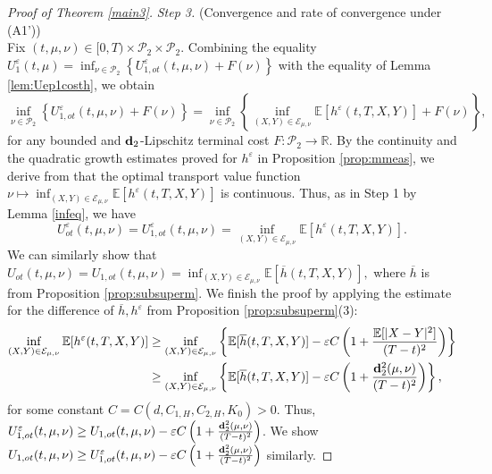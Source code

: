 \documentclass[reqno,11pt]{amsart}
\numberwithin{equation}{section}
\newcommand{\R}{\mathbb{R}} %
\newcommand{\e}{\varepsilon}
\newcommand{\nd}{\noindent}
\begin{document}
\begin{proof}[Proof of Theorem \ref{main3}]
\nd
    \textit{Step 3.} (Convergence and rate of convergence under (A1'))\\
    Fix $(t,\mu,\nu)\in [0,T)\times\mathcal{P}_2\times\mathcal{P}_2$. Combining the equality $U^\e_1(t,\mu)=\inf_{\nu\in \mathcal{P}_2}\left\{ U^\e_{1,ot}(t,\mu,\nu)+F(\nu) \right\}$ with the equality of Lemma \ref{lem:Uep1costh}, we obtain
    $$\inf_{\nu\in \mathcal{P}_2}\left\{ U^\e_{1,ot}(t,\mu,\nu)+F(\nu) \right\}=\inf_{\nu\in \mathcal{P}_2}\left\{ \inf_{(X, Y) \in \mathcal{E}_{\mu,\nu}}
\mathbb{E}[h^\e(t,T,X,Y)]+F(\nu) \right\},$$
    for any bounded and ${\bf d}_2$-Lipschitz terminal cost $F:\mathcal{P}_2\to \R$. By the continuity and the quadratic growth estimates proved for $h^\e$ in Proposition \ref{prop:mmeas}, we derive from \cite[Theorem 5.20]{villani2009optimal} that the optimal transport value function $\nu\mapsto \inf_{(X, Y) \in \mathcal{E}_{\mu,\nu}}
\mathbb{E}[h^\e(t,T,X,Y)]$ is continuous. Thus, as in Step 1 by Lemma \ref{infeq}, we have
$$U^\e_{ot}(t,\mu,\nu)=U^\e_{1,ot}(t,\mu,\nu)=\inf_{(X, Y) \in \mathcal{E}_{\mu,\nu}}\mathbb{E}[h^\e(t,T,X,Y)].$$
We can similarly show that
$U_{ot}(t,\mu,\nu)=U_{1,ot}(t,\mu,\nu)=\inf_{(X, Y) \in \mathcal{E}_{\mu,\nu}}\mathbb{E}[\overline{h}(t,T,X,Y)],$
where $\overline{h}$ is from Proposition \ref{prop:subsuperm}. We finish the proof by applying the estimate for the difference of $\overline{h},h^\e$ from Proposition \ref{prop:subsuperm}(3):
\begin{align*}
    \inf_{(X, Y) \in \mathcal{E}_{\mu,\nu}}\mathbb{E}[h^\e(t,T,X,Y)]&\ge \inf_{(X, Y) \in \mathcal{E}_{\mu,\nu}}\left\{\mathbb{E}[\overline{h}(t,T,X,Y)]-\e C\left(1+\frac{\mathbb{E}[|X-Y|^2]}{(T-t)^2}\right)\right\}\\
    &\ge  \inf_{(X, Y) \in \mathcal{E}_{\mu,\nu}}\left\{\mathbb{E}[\overline{h}(t,T,X,Y)]-\e C\left(1+\frac{{\bf d}_2^2(\mu,\nu)}{(T-t)^2}\right)\right\},
\end{align*}
for some constant \(C=C(d, C_{1, H}, C_{2, H}, K_0)>0\). Thus, $U^\e_{1,ot}(t,\mu,\nu)\ge U_{1,ot}(t,\mu,\nu)-\e C\left(1+\frac{{\bf d}_2^2(\mu,\nu)}{(T-t)^2}\right)$. We show $U_{1,ot}(t,\mu,\nu)\ge U^\e_{1,ot}(t,\mu,\nu)-\e C\left(1+\frac{{\bf d}_2^2(\mu,\nu)}{(T-t)^2}\right)$ similarly.
\end{proof}
\end{document}
